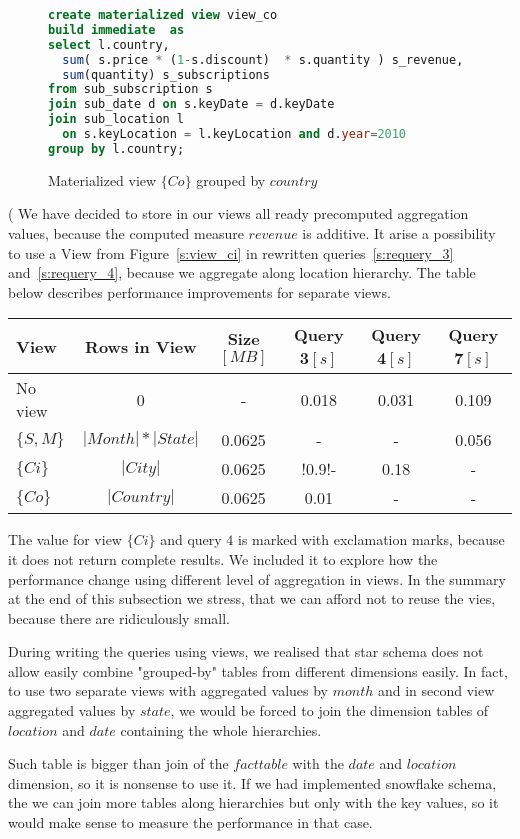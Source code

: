\begin{figure}[!hbp]
\begin{lstlisting}[language=sql] 
create materialized view view_co 
build immediate  as
select l.country, 
  sum( s.price * (1-s.discount)  * s.quantity ) s_revenue,
  sum(quantity) s_subscriptions
from sub_subscription s
join sub_date d on s.keyDate = d.keyDate
join sub_location l 
  on s.keyLocation = l.keyLocation and d.year=2010
group by l.country; 
\end{lstlisting}
\caption{\label{s:view_co} Materialized view $\{Co\}$ grouped by $country$}
\end{figure}
(
We have decided to store in our views all ready precomputed aggregation values, because the computed 
measure $revenue$ is additive. It arise a possibility to use a View from Figure~\ref{s:view_ci} in rewritten queries~\ref{s:requery_3} and~\ref{s:requery_4}, because we aggregate along location hierarchy.
The table below describes performance improvements for separate views. 

\begin{tabular}{|l|c|c|c|c|c|}
\hline
View & Rows in View & Size$[MB]$ & Query 3$[s]$ & Query 4$[s]$ & Query 7$[s]$\\
\hline
\hline
No view & 0 & - & 0.018 & 0.031 & 0.109 \\
$\{S,M\}$ & $|Month|*|State|$ & 0.0625 & - & - & 0.056\\
$\{Ci\}$ & $|City|$ & 0.0625 & !0.9!- & 0.18 & -\\
$\{Co\}$ & $|Country|$ &0.0625 & 0.01 & - & -\\
\hline
\end{tabular}

The value for view $\{Ci\}$ and query $4$ is marked with exclamation marks, 
because it does not return complete results. We included it to explore how the performance change 
using different level of aggregation in views. In the summary at the end of this subsection we stress,
that we can afford not to reuse the vies, because there are ridiculously small.

During writing the queries using views, we realised that star schema does not allow easily combine "grouped-by" tables from different dimensions easily. In fact, to use two separate views with aggregated values by $month$ and in second view aggregated values by $state$, we would be forced to join the dimension tables of $location$ and $date$ containing the whole hierarchies.

Such table is bigger than join of the $fact table$ with the $date$ and $location$ dimension, so it is nonsense to use it.
If we had implemented snowflake schema, the we can join more tables along hierarchies but only with the key values,
so it would make sense to measure the performance in that case.


